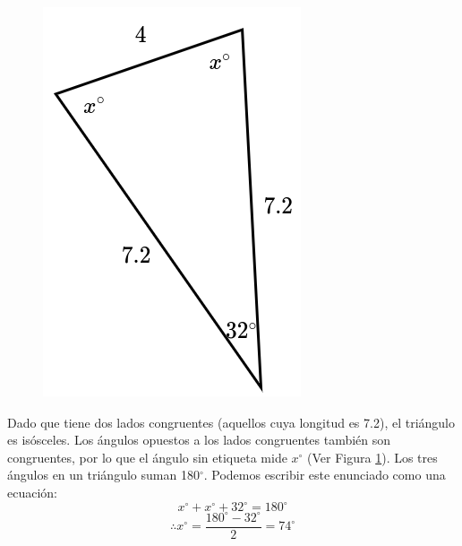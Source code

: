 \begin{minipage}[t][][t]{0.6\textwidth}
    \begin{solutionbox}{8cm}
        \begin{minipage}{0.3\textwidth}
            \begin{figure}[H]
                \centering
                \includegraphics[width=0.9\linewidth]{../images/findangle13a.png}
                \caption{}
                \label{fig:findangle13a}
            \end{figure}
        \end{minipage}\hfill
        \begin{minipage}{0.65\textwidth}
            Dado que tiene dos lados congruentes (aquellos cuya longitud es 7.2), el triángulo es isósceles. Los ángulos opuestos a los lados congruentes también son congruentes, por lo que el ángulo sin etiqueta mide $x^\circ$ (Ver Figura \ref{fig:findangle13a}).
            Los tres ángulos en un triángulo suman 180$^\circ$. Podemos escribir este enunciado como una ecuación:
            \[x^\circ + x^\circ + 32^\circ = 180^\circ \]
            \[\therefore x^\circ = \dfrac{180^\circ - 32^\circ}{2}  = 74^\circ\]
        \end{minipage}
    \end{solutionbox}
\end{minipage}